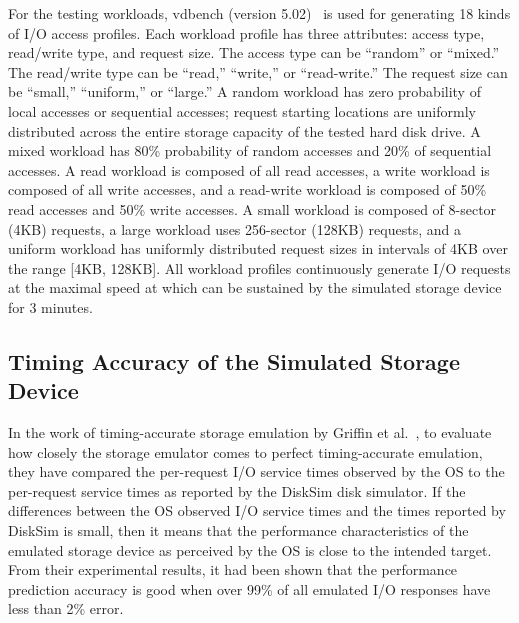For the testing workloads, vdbench (version 5.02)~\cite{Vdbench:2013} is used for generating 18 kinds of I/O access profiles. Each workload profile has three attributes: access type, read/write type, and request size. The access type can be ``random'' or ``mixed.'' The read/write type can be ``read,'' ``write,'' or ``read-write.'' The request size can be ``small,'' ``uniform,'' or ``large.'' A random workload has zero probability of local accesses or sequential accesses; request starting locations are uniformly distributed across the entire storage capacity of the tested hard disk drive. A mixed workload has 80\% probability of random accesses and 20\% of sequential accesses. A read workload is composed of all read accesses, a write workload is composed of all write accesses, and a read-write workload is composed of 50\% read accesses and 50\% write accesses. A small workload is composed of 8-sector (4KB) requests, a large workload uses 256-sector (128KB) requests, and a uniform workload has uniformly distributed request sizes in intervals of 4KB over the range [4KB, 128KB]. All workload profiles continuously generate I/O requests at the maximal speed at which can be sustained by the simulated storage device for 3 minutes.

\subsection{Timing Accuracy of the Simulated Storage Device}

In the work of timing-accurate storage emulation by Griffin et al.~\cite{Griffin:2002}, to evaluate how closely the storage emulator comes to perfect timing-accurate emulation, they have compared the per-request I/O service times observed by the OS to the per-request service times as reported by the DiskSim disk simulator. If the differences between the OS observed I/O service times and the times reported by DiskSim is small, then it means that the performance characteristics of the emulated storage device as perceived by the OS is close to the intended target. From their experimental results, it had been shown that the performance prediction accuracy is good when over 99\% of all emulated I/O responses have less than 2\% error. 

